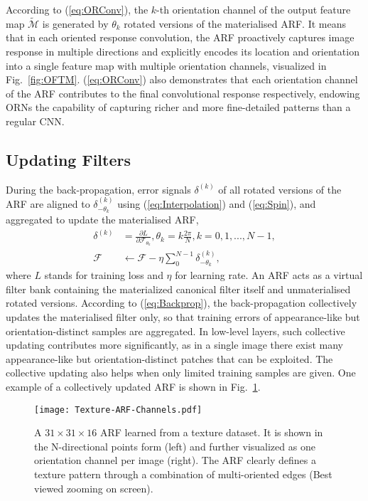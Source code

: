 \documentclass[10pt,twocolumn,letterpaper]{article}
\begin{document}
    According to (\ref{eq:ORConv}), the $k$-th orientation channel of the output feature map $\tilde{\mathcal{M}}$ is generated by $\theta_k$ rotated versions of the materialised ARF. It means that in each oriented response convolution, the ARF proactively captures image response in multiple directions and explicitly encodes its location and orientation into a single feature map with multiple orientation channels, visualized in Fig.~\ref{fig:OFTM}. (\ref{eq:ORConv}) also demonstrates that each orientation channel of the ARF contributes to the final convolutional response respectively, endowing ORNs the capability of capturing richer and more fine-detailed patterns than a regular CNN.

\subsection{Updating Filters}
    During the back-propagation, error signals $\delta^{(k)}$ of all rotated versions of the ARF are aligned to $\delta^{(k)}_{-\theta_k}$ using (\ref{eq:Interpolation}) and (\ref{eq:Spin}), and aggregated to update the materialised ARF,
    \begin{equation}
        \begin{aligned}
            \delta^{(k)} &= \frac{\partial L}{\partial \mathcal{F}_{\theta_k}}, \theta_k = k\frac{2\pi}{N}, {\scriptstyle k=0,1,...,N-1},  \\
            \mathcal{F} &\leftarrow \mathcal{F} - \eta\sum_0^{N-1} \delta^{(k)}_{-\theta_k},
        \end{aligned}
    \label{eq:Backprop}
    \end{equation}
    where $L$ stands for training loss and $\eta$ for learning rate.
    An ARF acts as a virtual filter bank containing the materialized canonical filter itself and unmaterialised rotated versions. According to (\ref{eq:Backprop}), the back-propagation collectively updates the materialised filter only, so that training errors of appearance-like but orientation-distinct samples are aggregated. In low-level layers, such collective updating contributes more significantly, as in a single image there exist many appearance-like but orientation-distinct patches that can be exploited.
    The collective updating also helps when only limited training samples are given.
    One example of a collectively updated ARF is shown in Fig.~\ref{fig:ARF-Channels}.

    \begin{figure}[t]
        \begin{center}
            \texttt{[image: Texture-ARF-Channels.pdf]}
        \end{center}
        \caption{
            A $31\times31\times16$ ARF learned from a texture dataset.
            It is shown in the N-directional points form (left) and further visualized as one orientation channel per image (right).
            The ARF clearly defines a texture pattern through a combination of multi-oriented edges
            (Best viewed zooming on screen).
        }
    \label{fig:ARF-Channels}
    \vspace{-0.8em}
    \end{figure}
\end{document}
